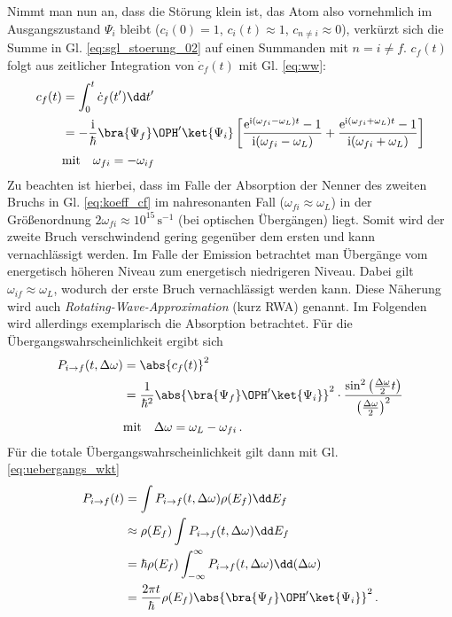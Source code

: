 Nimmt man nun an, dass die Störung klein ist, das Atom also vornehmlich im
Ausgangszustand $\Psi_i$ bleibt ($c_i(0)=1$, $c_i(t)\approx 1$, $c_{n\neq
i}\approx0$), verkürzt sich die Summe in Gl. \eqref{eq:sgl_stoerung_02}
auf einen Summanden mit $n=i\neq f$. $c_f(t)$ folgt aus zeitlicher Integration von $\dot c_f(t)$ mit
Gl. \eqref{eq:ww}:
\begin{equation}\label{eq:koeff_cf}
	\begin{split}
		c_f(t) &= \int_0^t{\dot c_f(t')\dd t'}\\
		&=
		-\frac{\mathrm{i}}{\hbar}\bra{\Psi_f}\OPH'\ket{\Psi_i}\left[\frac{\mathrm{e}^{\mathrm{i}(\omega_{fi}-\omega_L)t}-1}{\mathrm{i}(\omega_{fi}-\omega_L)}+\frac{\mathrm{e}^{\mathrm{i}(\omega_{fi}+\omega_L)t}-1}{\mathrm{i}(\omega_{fi}+\omega_L)}\right]\\
		&\text{mit}\quad
		\omega_{fi}=-\omega_{if}
	\end{split}
\end{equation}
Zu beachten ist hierbei, dass im Falle der Absorption der Nenner des zweiten
Bruchs in Gl. \eqref{eq:koeff_cf} im nahresonanten Fall
($\omega_{fi}\approx\omega_L$) in der Größenordnung $2\omega_{fi}\approx
10^{15}\,\text{s}^{-1}$ (bei optischen Übergängen) liegt. Somit wird der
zweite Bruch verschwindend gering gegenüber dem ersten und kann vernachlässigt
werden. Im Falle der Emission betrachtet man Übergänge vom energetisch höheren
Niveau zum energetisch niedrigeren Niveau. Dabei gilt
$\omega_{if}\approx\omega_L$, wodurch der erste Bruch vernachlässigt werden
kann. Diese Näherung wird auch \textit{Rotating-Wave-Approximation} (kurz RWA)
genannt. Im Folgenden wird allerdings exemplarisch die Absorption betrachtet.
Für die Übergangswahrscheinlichkeit ergibt sich
\begin{equation}\label{eq:uebergangs_wkt}
	\begin{split}
		P_{i\to f}(t,\Delta\omega) &= \abs{c_f(t)}^2\\
		& =
		\frac{1}{\hbar^2}\abs{\bra{\Psi_f}\OPH'\ket{\Psi_i}}^2\cdot\frac{\sin^2{\left(\frac{\Delta\omega}{2}t\right)}}{\left(\frac{\Delta\omega}{2}\right)^2}\\
		&\text{mit}\quad
		\Delta\omega=\omega_L-\omega_{fi}\,.
	\end{split}
\end{equation}
Für die totale Übergangswahrscheinlichkeit gilt dann mit Gl.
\eqref{eq:uebergangs_wkt}
\begin{equation}\label{eq:uebergangs_wkt_total}
	\begin{split}
		P_{i\to f}(t)
		&= \int{P_{i\to f}(t,\Delta\omega)\rho(E_f)}\dd E_f\\
		&\approx \rho(E_f)\int{P_{i\to f}(t,\Delta\omega)}\dd E_f\\
		&= \hbar\rho(E_f)\int_{-\infty}^{\infty}{P_{i\to
		f}(t,\Delta\omega)}\dd(\Delta\omega)\\
		&= \frac{2\pi t}{\hbar}\rho(E_f)\abs{\bra{\Psi_f}\OPH'\ket{\Psi_i}}^2\,.
	\end{split}
\end{equation}
